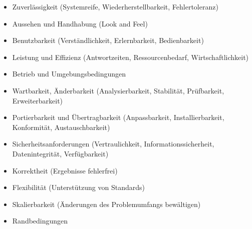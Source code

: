 \begin{itemize}
\item Zuverlässigkeit (Systemreife, Wiederherstellbarkeit, Fehlertoleranz)
\item Aussehen und Handhabung (Look and Feel)
\item Benutzbarkeit (Verständlichkeit, Erlernbarkeit, Bedienbarkeit)
\item Leistung und Effizienz (Antwortzeiten, Ressourcenbedarf, Wirtschaftlichkeit)
\item Betrieb und Umgebungsbedingungen
\item Wartbarkeit, Änderbarkeit (Analysierbarkeit, Stabilität, Prüfbarkeit, Erweiterbarkeit)
\item Portierbarkeit und Übertragbarkeit (Anpassbarkeit, Installierbarkeit, Konformität, Austauschbarkeit)
\item Sicherheitsanforderungen (Vertraulichkeit, Informationssicherheit, Datenintegrität, Verfügbarkeit)
\item Korrektheit (Ergebnisse fehlerfrei)
\item Flexibilität (Unterstützung von Standards)
\item Skalierbarkeit (Änderungen des Problemumfangs bewältigen)
\item Randbedingungen
\end{itemize}
